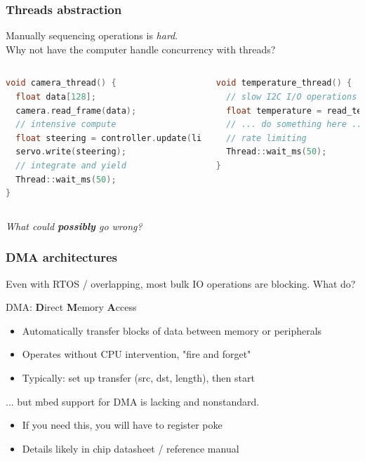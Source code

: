 \documentclass{beamer}
\begin{document}
\begin{frame}[fragile]
\frametitle{Threads abstraction}
Manually sequencing operations is \textit{hard}. \\
Why not have the computer handle concurrency with threads?
\begin{columns}[t]
\begin{lstlisting}[language=C++,basicstyle=\ttfamily\scriptsize]
void camera_thread() {
  float data[128];
  camera.read_frame(data);
  // intensive compute
  float steering = controller.update(line_detect(data));
  servo.write(steering);
  // integrate and yield
  Thread::wait_ms(50);
}
\end{lstlisting}
\begin{lstlisting}[language=C++,basicstyle=\ttfamily\scriptsize]
void temperature_thread() {
  // slow I2C I/O operations
  float temperature = read_temperature();
  // ... do something here ...
  // rate limiting
  Thread::wait_ms(50);
}
\end{lstlisting}
\end{columns}
\textit{What could \textbf{possibly} go wrong?}
\end{frame}


\begin{frame}
\frametitle{DMA architectures}
Even with RTOS / overlapping, most bulk IO operations are blocking. What do? \\
\hfill \break
{} {
DMA: \textbf{D}irect \textbf{M}emory \textbf{A}ccess
\begin{itemize}
  \item Automatically transfer blocks of data between memory or peripherals
  \item Operates without CPU intervention, "fire and forget"
  \item Typically: set up transfer (src, dst, length), then start
\end{itemize}
\hfill \break
... but mbed support for DMA is lacking and nonstandard.
\begin{itemize}
  \item If you need this, you will have to register poke
  \item Details likely in chip datasheet / reference manual
\end{itemize}
}
\end{frame}
\end{document}
